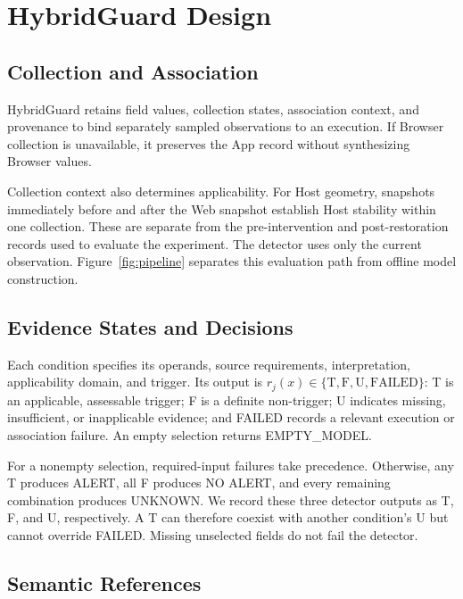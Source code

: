 \hypertarget{sec:3}{%
\section{HybridGuard Design}\label{sec:3}}

\hypertarget{sec:3-1}{%
\subsection{Collection and Association}\label{sec:3-1}}

HybridGuard retains field values, collection states, association context, and provenance to bind separately sampled observations to an execution. If Browser collection is unavailable, it preserves the App record without synthesizing Browser values.

Collection context also determines applicability. For Host geometry, snapshots immediately before and after the Web snapshot establish Host stability within one collection. These are separate from the pre-intervention and post-restoration records used to evaluate the experiment. The detector uses only the current observation. Figure~\ref{fig:pipeline} separates this evaluation path from offline model construction.



\hypertarget{sec:3-2}{%
\subsection{Evidence States and Decisions}\label{sec:3-2}}

Each condition specifies its operands, source requirements, interpretation, applicability domain, and trigger. Its output is \(r_j(x) \in \{\mathrm{T}, \mathrm{F}, \mathrm{U}, \mathrm{FAILED}\}\): T is an applicable, assessable trigger; F is a definite non-trigger; U indicates missing, insufficient, or inapplicable evidence; and FAILED records a relevant execution or association failure. An empty selection returns EMPTY\_\allowbreak{}MODEL.

For a nonempty selection, required-input failures take precedence. Otherwise, any T produces ALERT, all F produces NO ALERT, and every remaining combination produces UNKNOWN. We record these three detector outputs as T, F, and U, respectively. A T can therefore coexist with another condition's U but cannot override FAILED. Missing unselected fields do not fail the detector.

\hypertarget{sec:3-3}{%
\subsection{Semantic References}\label{sec:3-3}}

